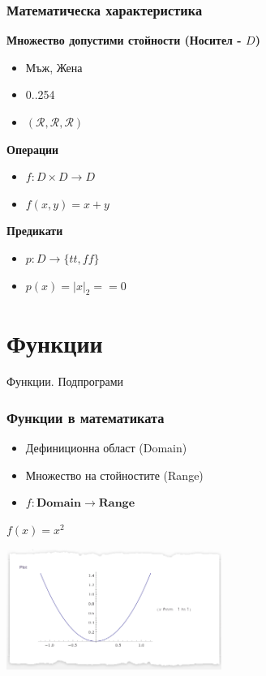 \documentclass{beamer}
\begin{document}
\begin{frame}[fragile]
\frametitle{Математическа характеристика}


\textbf{Множество допустими стойности (Носител - $D$)}

\pause

\begin{itemize}
  \item Мъж, Жена
  \item 0..254
  \item $(\mathcal{R},\mathcal{R},\mathcal{R})$
\end{itemize}

\pause

\textbf{Операции}

\begin{itemize}
  \item $f:D\times D \rightarrow D$
  \item $f(x,y)=x+y$
\end{itemize}


\pause

\textbf{Предикати}

\begin{itemize}
  \item $p:D \rightarrow \{tt,ff\}$
  \item $p(x)=|x|_2==0$
\end{itemize}


\end{frame}


\section{Функции}

\begin{frame}
\centerline{Функции. Подпрограми}
\end{frame}

\begin{frame}[fragile]
\frametitle{Функции в математиката}


\begin{itemize}
  \item Дефиниционна област (Domain)
  \item Множество на стойностите (Range)
  \item $f:\mathbf{Domain} \rightarrow \mathbf{Range}$
\end{itemize}


\vspace{0.2cm}
$f(x) = x^2$

\begin{center}
\includegraphics[width=7cm]{images/square}
\end{center}


\end{frame}
\end{document}
